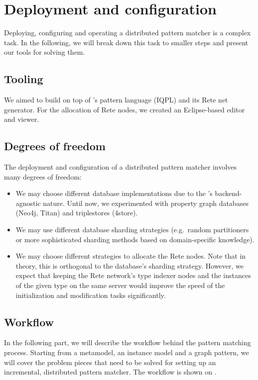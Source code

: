 \section{Deployment and configuration}
\label{sec:deployment-configuration}

Deploying, configuring and operating a distributed pattern matcher is a complex task. In the following, we will break down this task to smaller steps and present our tools for solving them. 

\subsection{Tooling}

We aimed to build \iqd{} on top of \eiq{}'s pattern language (IQPL) and its Rete net generator. For the allocation of Rete nodes, we created an Eclipse-based editor and viewer.

\subsection{Degrees of freedom}

The deployment and configuration of a distributed pattern matcher involves many degrees of freedom:

\begin{itemize}
  \item We may choose different database implementations due to the \iqd{}'s backend-agnostic nature. Until now, we experimented with property graph databases (Neo4j, Titan) and triplestores (4store).
  \item We may use different database sharding strategies (e.g.\ random partitioners or more sophisticated sharding methods based on domain-specific knowledge).
  \item We may choose different strategies to allocate the Rete nodes. Note that in theory, this is orthogonal to the database's sharding strategy. However, we expect that keeping the Rete network's type indexer nodes and the instances of the given type on the same server would improve the speed of the initialization and modification tasks significantly.
\end{itemize}
 
\subsection{Workflow}
\label{subsec:workflow}

In the following part, we will describe the workflow behind the pattern matching process. Starting from a metamodel, an instance model and a graph pattern, we will cover the problem pieces that need to be solved for setting up an incremental, distributed pattern matcher. The workflow is shown on .

